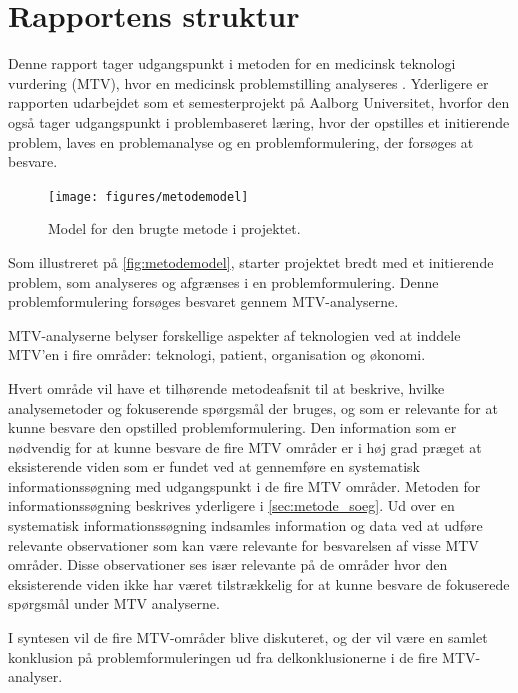 \chapter{Rapportens struktur} \label{metode}
Denne rapport tager udgangspunkt i metoden for en medicinsk teknologi vurdering (MTV), hvor en medicinsk problemstilling analyseres \citep{mtvhaandbog}. Yderligere er rapporten udarbejdet som et semesterprojekt på Aalborg Universitet, hvorfor den også tager udgangspunkt i problembaseret læring, hvor der opstilles et initierende problem, laves en problemanalyse og en problemformulering, der forsøges at besvare. 


\begin{figure}[H]
	\centering
	\texttt{[image: figures/metodemodel]}
	\caption{Model for den brugte metode i projektet.}
	\label{fig:metodemodel}
\end{figure}

\noindent
Som illustreret på \autoref{fig:metodemodel}, starter projektet bredt med et initierende problem, som analyseres og afgrænses i en problemformulering. Denne problemformulering forsøges besvaret gennem MTV-analyserne. 

MTV-analyserne belyser forskellige aspekter af teknologien ved at inddele MTV'en i fire områder: teknologi, patient, organisation og økonomi. %

Hvert område vil have et tilhørende metodeafsnit til at beskrive, hvilke analysemetoder og fokuserende spørgsmål der bruges, og som er relevante for at kunne besvare den opstilled problemformulering. Den information som er nødvendig for at kunne besvare de fire MTV områder er i høj grad præget at eksisterende viden som er fundet ved at gennemføre en systematisk informationssøgning med udgangspunkt i de fire MTV områder. Metoden for informationssøgning beskrives yderligere i \autoref{sec:metode_soeg}. Ud over en systematisk informationssøgning indsamles information og data ved at udføre relevante observationer som kan være relevante for besvarelsen af visse MTV områder. Disse observationer ses især relevante på de områder hvor den eksisterende viden ikke har været tilstrækkelig for at kunne besvare de fokuserede spørgsmål under MTV analyserne.

I syntesen vil de fire MTV-områder blive diskuteret, og der vil være en samlet konklusion på problemformuleringen ud fra delkonklusionerne i de fire MTV-analyser. 

